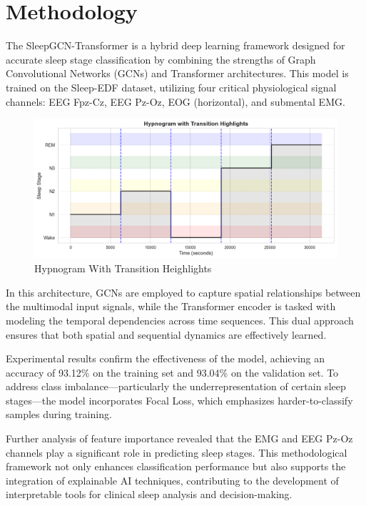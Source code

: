 
\section{Methodology}



The SleepGCN-Transformer is a hybrid deep learning framework designed for accurate sleep stage classification by combining the strengths of Graph Convolutional Networks (GCNs) and Transformer architectures. This model is trained on the Sleep-EDF dataset, utilizing four critical physiological signal channels: EEG Fpz-Cz, EEG Pz-Oz, EOG (horizontal), and submental EMG.


\begin{figure}
	\centering
	\includegraphics[width=0.8\linewidth]{"img/paper_3/hypnogram sleep stage transition"}
	\caption{Hypnogram With Transition Heighlights }
	\label{fig:hypnogram-sleep-stage-transition}
\end{figure}




In this architecture, GCNs are employed to capture spatial relationships between the multimodal input signals, while the Transformer encoder is tasked with modeling the temporal dependencies across time sequences. This dual approach ensures that both spatial and sequential dynamics are effectively learned.

Experimental results confirm the effectiveness of the model, achieving an accuracy of 93.12\% on the training set and 93.04\% on the validation set. To address class imbalance—particularly the underrepresentation of certain sleep stages—the model incorporates Focal Loss, which emphasizes harder-to-classify samples during training.

Further analysis of feature importance revealed that the EMG and EEG Pz-Oz channels play a significant role in predicting sleep stages. This methodological framework not only enhances classification performance but also supports the integration of explainable AI techniques, contributing to the development of interpretable tools for clinical sleep analysis and decision-making.

